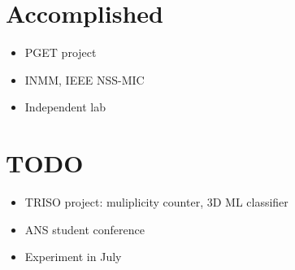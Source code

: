 \documentclass[letterpaper,11pt]{article} %
\begin{document}
\section{Accomplished}
\begin{itemize}
    \item PGET project
    \item INMM, IEEE NSS-MIC
    \item Independent lab
\end{itemize}

\section{TODO}
\begin{itemize}
    \item TRISO project: muliplicity counter, 3D ML classifier
    \item ANS student conference
    \item Experiment in July
\end{itemize}
\end{document}
